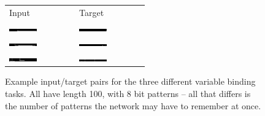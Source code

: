 \begin{figure}
\centering
	\begin{tabu} to \textwidth {XX}
		Input & Target \\
		\includegraphics[width=0.45\textwidth, interpolate=false]{exps/vbind/100x1input} & 
		\includegraphics[width=0.45\textwidth, interpolate=false]{exps/vbind/100x1target} \\
		\includegraphics[width=0.45\textwidth, interpolate=false]{exps/vbind/100x2input} & 
		\includegraphics[width=0.45\textwidth, interpolate=false]{exps/vbind/100x2target} \\
		\includegraphics[width=0.45\textwidth, interpolate=false]{exps/vbind/100x3input} & 
		\includegraphics[width=0.45\textwidth, interpolate=false]{exps/vbind/100x3target} \\
	\end{tabu}
	\caption[Example instances of variable binding]{Example input/target pairs for the three
	different variable binding tasks. All have length 100, with 8 bit patterns -- all that differs
	is the number of patterns the network may have to remember at once.}
	\label{fig:vbinddata}
\end{figure}

